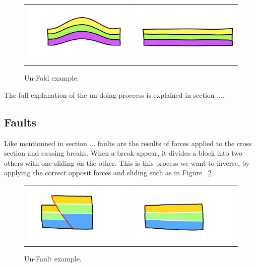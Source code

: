 \documentclass[12pt, a4paper]{memoir} %
\begin{document}
\begin{figure}[htb]
\centering
\begin{tabular}{@{}cc@{}}
\includegraphics[width=.35\textwidth]{unFoldDescription0.png}&
\includegraphics[width=.35\textwidth]{unFoldDescription1.png}\\
\end{tabular}
\caption{Un-Fold example.}
\label{unfoldeg}
\end{figure}

The full explanation of the un-doing proccess is explained in section ....

\subsection{Faults}
Like mentionned in section ... faults are the results of forces applied to the cross section and causing breaks. When a break appear, it divides a block into two others with one sliding on the other. This is this process we want to inverse, by applying the correct opposit forces and sliding such as in Figure ~\ref{unfaulteg}

\begin{figure}[htb]
\centering
\begin{tabular}{@{}cc@{}}
\includegraphics[width=.35\textwidth]{unFaultDescription0.png}&
\includegraphics[width=.35\textwidth]{unFaultDescription1.png}\\
\end{tabular}
\caption{Un-Fault example.}
\label{unfaulteg}
\end{figure} 
\end{document}
